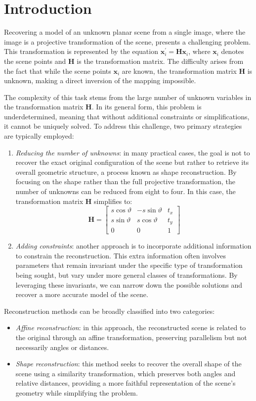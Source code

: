 \section{Introduction}

Recovering a model of an unknown planar scene from a single image, where the image is a projective transformation of the scene, presents a challenging problem.
This transformation is represented by the equation $\mathbf{x}_i^\prime=\mathbf{Hx}_i$, where $\mathbf{x}_i$ denotes the scene points and $\mathbf{H}$ is the transformation matrix.
The difficulty arises from the fact that while the scene points $\mathbf{x}_i$ are known, the transformation matrix $\mathbf{H}$ is unknown, making a direct inversion of the mapping impossible.

The complexity of this task stems from the large number of unknown variables in the transformation matrix $\mathbf{H}$. 
In its general form, this problem is underdetermined, meaning that without additional constraints or simplifications, it cannot be uniquely solved. 
To address this challenge, two primary strategies are typically employed:
\begin{enumerate}
    \item \textit{Reducing the number of unknowns}: in many practical cases, the goal is not to recover the exact original configuration of the scene but rather to retrieve its overall geometric structure, a process known as shape reconstruction.
        By focusing on the shape rather than the full projective transformation, the number of unknowns can be reduced from eight to four. In this case, the transformation matrix $\mathbf{H}$ simplifies to:
        \[\mathbf{H}= \begin{bmatrix} s\cos \vartheta & -s\sin \vartheta & t_x \\ s\sin \vartheta & s\cos \vartheta & t_y \\  0 & 0 & 1 \end{bmatrix}\]
    \item \textit{Adding constraints}: another approach is to incorporate additional information to constrain the reconstruction.
        This extra information often involves parameters that remain invariant under the specific type of transformation being sought, but vary under more general classes of transformations.
        By leveraging these invariants, we can narrow down the possible solutions and recover a more accurate model of the scene.
\end{enumerate}
Reconstruction methods can be broadly classified into two categories:
\begin{itemize}
    \item \textit{Affine reconstruction}: in this approach, the reconstructed scene is related to the original through an affine transformation, preserving parallelism but not necessarily angles or distances.
    \item \textit{Shape reconstruction}: this method seeks to recover the overall shape of the scene using a similarity transformation, which preserves both angles and relative distances, providing a more faithful representation of the scene's geometry while simplifying the problem.
\end{itemize}